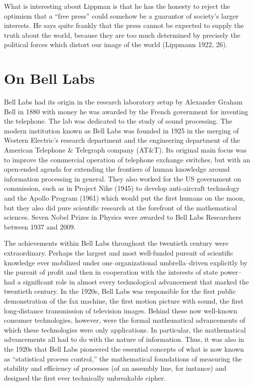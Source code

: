 \documentclass[12pt,book]{article}
\begin{document}
What is interesting about Lippman is that he has the honesty to reject
the optimism that a ``free press'' could somehow be a guarantor of
society's larger interests. He says quite frankly that the press cannot
be expected to supply the truth about the world, because they are too
much determined by precisely the political forces which distort our
image of the world (Lippmann 1922, 26).

\section{On Bell Labs}\label{on-bell-labs}

Bell Labs had its origin in the research laboratory setup by Alexander
Graham Bell in 1880 with money he was awarded by the French government
for inventing the telephone. The lab was dedicated to the study of sound
processing. The modern institution known as Bell Labs was founded in
1925 in the merging of Western Electric's research department and the
engineering department of the American Telephone \& Telegraph company
(AT\&T). Its original main focus was to improve the commercial operation
of telephone exchange switches, but with an open-ended agenda for
extending the frontiers of human knowledge around information processing
in general. They also worked for the US government on commission, such
as in Project Nike (1945) to develop anti-aircraft technology and the
Apollo Program (1961) which would put the first humans on the moon, but
they also did pure scientific research at the forefront of the
mathematical sciences. Seven Nobel Prizes in Physics were awarded to
Bell Labs Researchers between 1937 and 2009.

The achievements within Bell Labs throughout the twentieth century were
extraordinary. Perhaps the largest and most well-funded pursuit of
scientific knowledge ever mobilized under one organizational
umbrella--driven explicitly by the pursuit of profit and then in
cooperation with the interests of state power--had a significant role in
almost every technological advancement that marked the twentieth
century. In the 1920s, Bell Labs was responsible for the first public
demonstration of the fax machine, the first motion picture with sound,
the first long-distance transmission of television images. Behind these
now well-known consumer technologies, however, were the formal
mathematical advancements of which these technologies were only
applications. In particular, the mathematical advancements all had to do
with the nature of information. Thus, it was also in the 1920s that Bell
Labs pioneered the essential concepts of what is now known as
``statistical process control,'' the mathematical foundations of
measuring the stability and efficiency of processes (of an assembly
line, for instance) and designed the first ever technically unbreakable
cipher.
\end{document}
